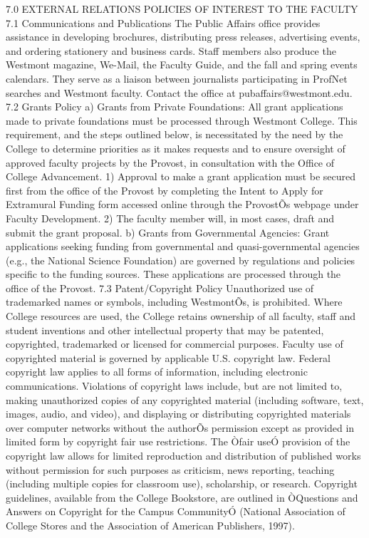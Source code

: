 \documentclass[letterpaper, 11pt]{article}
\begin{document}
	7.0 EXTERNAL RELATIONS POLICIES OF INTEREST TO THE FACULTY
	7.1 Communications and Publications
	The Public Affairs office provides assistance in developing brochures, distributing press releases, advertising events, and ordering stationery and business cards. Staff members also produce the Westmont magazine, We-Mail, the Faculty Guide, and the fall and spring events calendars.  They serve as a liaison between journalists participating in ProfNet searches and Westmont faculty. Contact the office at pubaffairs@westmont.edu.
	7.2 Grants Policy
	a) Grants from Private Foundations:  All grant applications made to private foundations must be processed through Westmont College.  This requirement, and the steps outlined below, is necessitated by the need by the College to determine priorities as it makes requests and to ensure oversight of approved faculty projects by the Provost, in consultation with the Office of College Advancement.
	1) Approval to make a grant application must be secured first from the office of the Provost by completing the Intent to Apply for Extramural Funding form accessed online through the ProvostÕs webpage under Faculty Development.
	2)  The faculty member will, in most cases, draft and submit the grant proposal.
	b) Grants from Governmental Agencies:  Grant applications seeking funding from governmental and quasi-governmental agencies (e.g., the National Science Foundation) are governed by regulations and policies specific to the funding sources. These applications are processed through the office of the Provost.
	7.3 Patent/Copyright Policy
	Unauthorized use of trademarked names or symbols, including WestmontÕs, is prohibited.  Where College resources are used, the College retains ownership of all faculty, staff and student inventions and other intellectual property that may be patented, copyrighted, trademarked or licensed for commercial purposes.
	Faculty use of copyrighted material is governed by applicable U.S. copyright law.  Federal copyright law applies to all forms of information, including electronic communications.  Violations of copyright laws include, but are not limited to, making unauthorized copies of any copyrighted material (including software, text, images, audio, and video), and displaying or distributing copyrighted materials over computer networks without the authorÕs permission except as provided in limited form by copyright fair use restrictions.  The Òfair useÓ provision of the copyright law allows for limited reproduction and distribution of published works without permission for such purposes as criticism, news reporting, teaching (including multiple copies for classroom use), scholarship, or research.  Copyright guidelines, available from the College Bookstore, are outlined in ÒQuestions and Answers on Copyright for the Campus CommunityÓ (National Association of College Stores and the Association of American Publishers, 1997).
\end{document}
